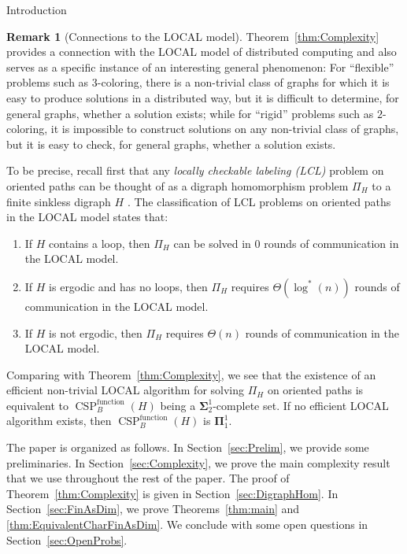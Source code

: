 \documentclass[psamsfonts]{amsart}
\theoremstyle{definition}
\newtheorem{remark}[thm]{Remark}
\theoremstyle{remark}
\numberwithin{equation}{section}
\newcommand\mbf{\mathbf}
\newcommand{\LOCAL}{\textsf{LOCAL }}
\begin{document}
\begin{section}{Introduction}
    \begin{remark}[Connections to the \LOCAL model]
    Theorem~\ref{thm:Complexity} provides a connection with the \LOCAL model of distributed computing and also serves as a specific instance of an interesting general phenomenon:
    For ``flexible'' problems such as $3$-coloring, there is a non-trivial class of graphs for which it is easy to produce solutions in a distributed way, but it is difficult to determine, for general graphs, whether a solution exists; while for ``rigid'' problems such as $2$-coloring, it is impossible to construct solutions on any non-trivial class of graphs, but it is easy to check, for general graphs, whether a solution exists.

    To be precise, recall first that any \emph{locally checkable labeling (LCL)} problem on oriented paths can be thought of as a digraph homomorphism problem $\Pi_H$ to a finite sinkless digraph $H$ \cite{bhk+2017}.
    The classification of LCL problems on oriented paths in the \LOCAL model \cite{bhk+2017} states that:
        \begin{enumerate}
            \item [(i)] If $H$ contains a loop, then $\Pi_H$ can be solved in $0$ rounds of communication in the \LOCAL model.
            \item [(ii)] If $H$ is ergodic and has no loops, then $\Pi_H$ requires $\Theta(\log^*(n))$ rounds of communication in the \LOCAL model.
            \item [(iii)] If $H$ is not ergodic, then $\Pi_H$ requires $\Theta(n)$ rounds of communication in the \LOCAL model.
        \end{enumerate}
    Comparing with Theorem~\ref{thm:Complexity}, we see that the existence of an efficient non-trivial \LOCAL algorithm for solving $\Pi_H$ on oriented paths is equivalent to $\operatorname{CSP}^{\operatorname{function}}_B(H)$ being a $\mbf{\Sigma}^1_2$-complete set.
    If no efficient \LOCAL algorithm exists, then $\operatorname{CSP}^{\operatorname{function}}_B(H)$ is $\mbf{\Pi}^1_1$.
    \end{remark}






The paper is organized as follows. In Section~\ref{sec:Prelim}, we provide some preliminaries. In Section~\ref{sec:Complexity}, we prove the main complexity result that we use throughout the rest of the paper. The proof of Theorem~\ref{thm:Complexity} is given in Section~\ref{sec:DigraphHom}. In Section~\ref{sec:FinAsDim}, we prove Theorems~\ref{thm:main} and \ref{thm:EquivalentCharFinAsDim}. We conclude with some open questions in Section~\ref{sec:OpenProbs}.



\end{section}
\end{document}
